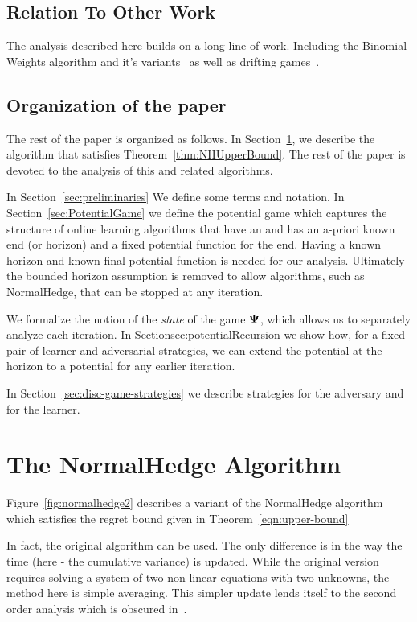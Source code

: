 \documentclass{article}[12pt]
\begin{document}
\subsection{Relation To Other Work}

The analysis described here builds on a long line of work. Including
the Binomial Weights algorithm and it's
variants~\cite{cesa1996line,abernethy2006continuous,abernethy2008optimal}
as well as drifting games~\cite{schapire2001drifting,freund2002drifting}.

\subsection{Organization of the paper}
The rest of the paper is organized as follows. In
Section~\ref{sec:NormalHedgeAlg}, we describe the algorithm that
satisfies Theorem~\ref{thm:NHUpperBound}. The rest of the paper is
devoted to the analysis of this and related algorithms.

In Section~\ref{sec:preliminaries} We define some terms and
notation. In Section~\ref{sec:PotentialGame} we define the potential
game which captures the structure of online learning algorithms that
have an and has an a-priori known end (or horizon) and a fixed
potential function for the end.  Having a known horizon and known
final potential function is needed for our analysis. Ultimately the
bounded horizon assumption is removed to allow algorithms, such as
NormalHedge, that can be stopped at any iteration.

We formalize the notion of the {\em state} of the game ${\bf \Psi}$, which
allows us to separately analyze each iteration. In
Section{sec:potentialRecursion} we show how, for a fixed pair of
learner and adversarial strategies, we can extend the potential at the
horizon to a potential for any earlier iteration.

In Section~\ref{sec:disc-game-strategies} we describe strategies for the adversary and for the learner.

\section{The NormalHedge  Algorithm} \label{sec:NormalHedgeAlg}
Figure~\ref{fig:normalhedge2} describes a variant of the NormalHedge
algorithm~\cite{chaudhuri2009parameter} which satisfies the regret
bound given in Theorem~\ref{eqn:upper-bound}

In fact, the original algorithm can be used. The only difference is in
the way the time (here - the cumulative variance) is updated. While
the original version requires solving a system of two non-linear
equations with two unknowns, the method here is simple averaging.
This simpler update lends itself to the second order analysis which is
obscured in~\cite{chaudhuri2009parameter}.
\end{document}
